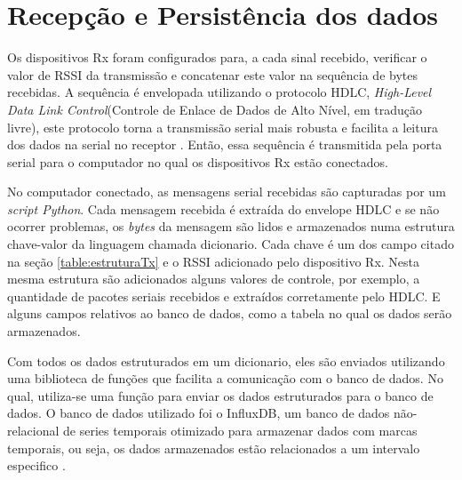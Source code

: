 \section{Recepção e Persistência dos dados}
Os dispositivos Rx foram configurados para, a cada sinal recebido, verificar o valor de RSSI da transmissão e concatenar este valor na sequência de bytes recebidas. A sequência é envelopada utilizando o protocolo HDLC, \emph{High-Level Data Link Control}(Controle de Enlace de Dados de Alto Nível, em tradução livre), este protocolo torna a transmissão serial mais robusta e facilita a leitura dos dados na serial no receptor \cite{tanembaum2011}. Então, essa sequência é transmitida pela porta serial para o computador no qual os dispositivos Rx estão conectados.

No computador conectado, as mensagens serial recebidas são capturadas por um \emph{script Python}. Cada mensagem recebida é extraída do envelope HDLC e se não ocorrer problemas, os \emph{bytes} da mensagem são lidos e armazenados numa estrutura chave-valor da linguagem chamada dicionario. Cada chave é um dos campo citado na seção \ref{table:estruturaTx} e o RSSI adicionado pelo dispositivo Rx. Nesta mesma estrutura são adicionados alguns valores de controle, por exemplo, a quantidade de pacotes seriais recebidos e extraídos corretamente pelo HDLC. E alguns campos relativos ao banco de dados, como a tabela no qual os dados serão armazenados.

Com todos os dados estruturados em um dicionario, eles são enviados utilizando uma biblioteca de funções que facilita a comunicação com o banco de dados. No qual, utiliza-se uma função para enviar os dados estruturados para o banco de dados. O banco de dados utilizado foi o InfluxDB, um banco de dados não-relacional de series temporais otimizado para armazenar dados com marcas temporais, ou seja, os dados armazenados estão relacionados a um intervalo especifico \cite{influxData}.


